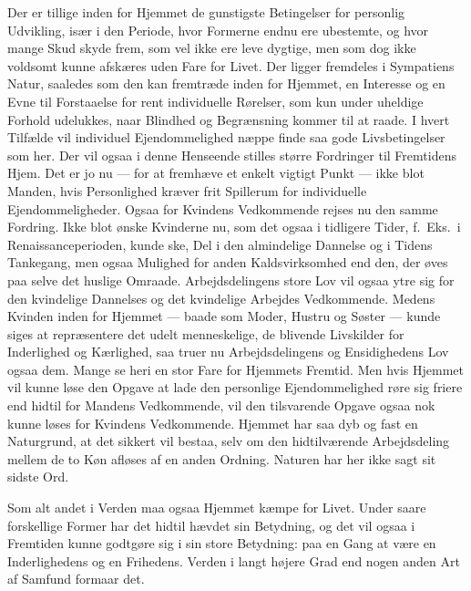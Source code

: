 \documentclass[12pt,a4paper]{article}
\newcommand{\opage}[1]{\marginnote{\footnotesize\textit{[#1]}}}
\begin{document}
Der er tillige inden for Hjemmet de gunstigste Betingelser for personlig
Udvikling, især i den Periode, hvor Formerne endnu ere ubestemte, og hvor
mange Skud skyde frem, som vel ikke ere leve%
\opage{12}dygtige, men som dog ikke voldsomt
kunne afskæres uden Fare for Livet. Der ligger fremdeles i Sympatiens Natur,
saaledes som den kan fremtræde inden for Hjemmet, en Interesse og en Evne til
Forstaae\-lse for rent individuelle Rørelser, som kun under uheldige Forhold
udelukkes, naar Blindhed og Begrænsning kommer til at raade. I hvert Tilfælde
vil individuel Ejendommelighed næppe finde saa gode Livsbetingelser som her.
Der vil ogsaa i denne Henseende stilles større Fordringer til Fremtidens Hjem.
Det er jo nu --- for at fremhæve et enkelt vigtigt Punkt --- ikke blot Manden,
hvis Personlighed kræver frit Spillerum for individuelle Ejendommeligheder.
Ogsaa for Kvindens Vedkommende rejses nu den samme Fordring. Ikke blot ønske
Kvinderne nu, som det ogsaa i tidligere Tider, f.\ Eks.\ i
Renaissanceperioden, kunde ske, Del i den almindelige Dannelse og i Tidens
Tankegang, men ogsaa Mulighed for anden Kaldsvirksomhed end den, der øves paa
selve det huslige Omraade. Arbejdsdelingens store Lov vil ogsaa ytre sig for
den kvindelige Dannelses og det kvindelige Arbejdes Vedkommende. Medens
Kvinden inden for Hjemmet --- baade som Moder, Hustru og Søster --- kunde
siges at repræsentere det udelt menneskelige, de blivende Livskilder for
Inderlighed og Kærlighed, saa truer nu Arbejdsdelingens og Ensidighedens Lov
ogsaa dem. Mange se heri en stor Fare for Hjemmets Fremtid. Men hvis Hjemmet
vil kunne løse den Opgave at lade den personlige Ejendommelighed røre sig
friere end hidtil for Mandens Vedkommende, vil den tilsvarende Opgave ogsaa
nok kunne løses for Kvindens Vedkommende. Hjemmet har saa dyb og fast en
Naturgrund, at det sikkert vil bestaa, selv om den hidtilværende Arbejdsdeling
mellem de to Køn afløses af en anden Ordning. Naturen har her ikke sagt sit
sidste Ord.

Som alt andet i Verden maa ogsaa Hjemmet kæmpe for Livet. Under saare
forskellige Former har det hidtil hævdet sin Betydning, og det vil ogsaa i
Fremtiden kunne godtgøre sig i sin store Betydning: paa en Gang at være en
Inderlighedens og en Frihedens. Verden i langt højere Grad end nogen anden Art %
af Samfund formaar det.
\end{document}

